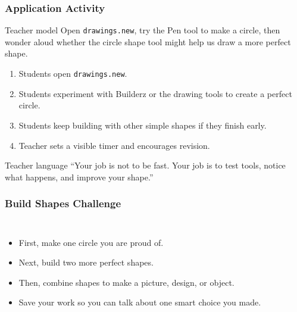 \documentclass[aspectratio=169]{beamer}
\begin{document}
\begin{frame}[plain]
\frametitle{Application Activity}
\begin{block}{Teacher model}
\large Open \texttt{drawings.new}, try the Pen tool to make a circle, then wonder aloud whether the circle shape tool might help us draw a more perfect shape.
\end{block}
\vspace{0.2cm}
\begin{enumerate}
\large
\item Students open \texttt{drawings.new}.
\item Students experiment with Builderz or the drawing tools to create a perfect circle.
\item Students keep building with other simple shapes if they finish early.
\item Teacher sets a visible timer and encourages revision.
\end{enumerate}
\vspace{0.2cm}
\begin{block}{Teacher language}
\large ``Your job is not to be fast. Your job is to test tools, notice what happens, and improve your shape.''
\end{block}
\end{frame}

\begin{frame}[plain]
\frametitle{Build Shapes Challenge}
\begin{columns}[T,totalwidth=\textwidth]
\begin{itemize}
\large
\item First, make one circle you are proud of.
\item Next, build two more perfect shapes.
\item Then, combine shapes to make a picture, design, or object.
\item Save your work so you can talk about one smart choice you made.
\end{itemize}
\end{columns}
\end{frame}
\end{document}
